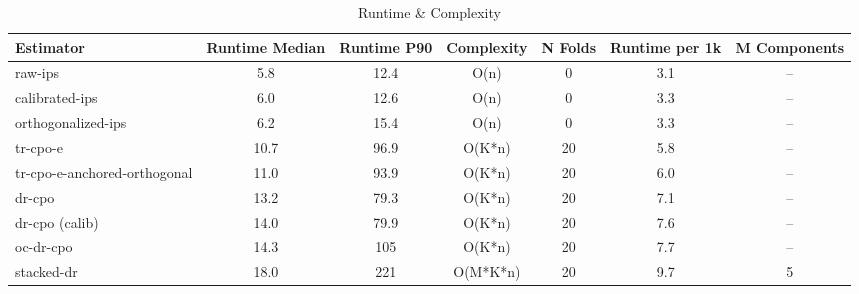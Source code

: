 \begin{table}[htbp]
\centering
\caption{Runtime & Complexity}
\label{tab:A6}
\begin{tabular}{l|cccccc}
\toprule
Estimator & Runtime Median & Runtime P90 & Complexity & N Folds & Runtime per 1k & M Components \\
\midrule
raw-ips & 5.8 & 12.4 & O(n) & 0 & 3.1 & -- \\
calibrated-ips & 6.0 & 12.6 & O(n) & 0 & 3.3 & -- \\
orthogonalized-ips & 6.2 & 15.4 & O(n) & 0 & 3.3 & -- \\
tr-cpo-e & 10.7 & 96.9 & O(K*n) & 20 & 5.8 & -- \\
tr-cpo-e-anchored-orthogonal & 11.0 & 93.9 & O(K*n) & 20 & 6.0 & -- \\
dr-cpo & 13.2 & 79.3 & O(K*n) & 20 & 7.1 & -- \\
dr-cpo (calib) & 14.0 & 79.9 & O(K*n) & 20 & 7.6 & -- \\
oc-dr-cpo & 14.3 & 105 & O(K*n) & 20 & 7.7 & -- \\
stacked-dr & 18.0 & 221 & O(M*K*n) & 20 & 9.7 & 5 \\
\bottomrule
\end{tabular}
\end{table}